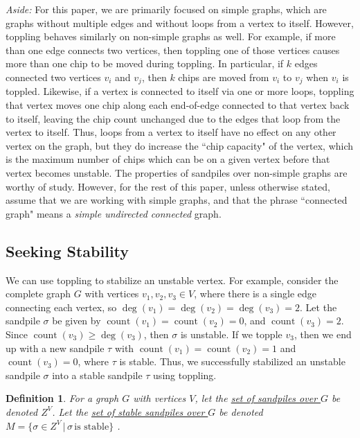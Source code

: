 \documentclass[12pt]{article}
\DeclareMathOperator{\ct}{count}
\DeclareMathOperator{\dg}{deg}
\newtheorem{definition}{Definition}
\begin{document}
\textit{Aside:}  For this paper, we are primarily focused on simple graphs, which are graphs without multiple edges and without loops from a vertex to itself.  However, toppling behaves similarly on non-simple graphs as well.  For example, if more than one edge connects two vertices, then toppling one of those vertices causes more than one chip to be moved during toppling.  In particular, if $k$ edges connected two vertices $v_i$ and $v_j$, then $k$ chips are moved from $v_i$ to $v_j$ when $v_i$ is toppled.  Likewise, if a vertex is connected to itself via one or more loops, toppling that vertex moves one chip along each end-of-edge connected to that vertex back to itself, leaving the chip count unchanged due to the edges that loop from the vertex to itself.  Thus, loops from a vertex to itself have no effect on any other vertex on the graph, but they do increase the ``chip capacity" of the vertex, which is the maximum number of chips which can be on a given vertex before that vertex becomes unstable.  The properties of sandpiles over non-simple graphs are worthy of study.  However, for the rest of this paper, unless otherwise stated, assume that we are working with simple graphs, and that the phrase ``connected graph" means a \textit{simple undirected connected} graph.

\subsection{Seeking Stability}

We can use toppling to stabilize an unstable vertex.  For example, consider the complete graph $G$ with vertices $v_1,v_2,v_3 \in V$, where there is a single edge connecting each vertex, so $\dg(v_1) = \dg(v_2) = \dg(v_3) = 2$.  Let the sandpile $\sigma$ be given by $\ct(v_1) = \ct(v_2) = 0$, and $\ct(v_3) = 2$.  Since $\ct(v_3) \geq \dg(v_3)$, then $\sigma$ is unstable.  If we topple $v_3$, then we end up with a new sandpile $\tau$ with $\ct(v_1) = \ct(v_2) = 1$ and $\ct(v_3) = 0$, where $\tau$ is stable.  Thus, we successfully stabilized an unstable sandpile $\sigma$ into a stable sandpile $\tau$ using toppling.

\begin{definition}
    For a graph $G$ with vertices $V$, let the \underline{set of sandpiles over $G$} be denoted $Z^V$.  Let the \underline{set of stable sandpiles over $G$} be denoted $M = \{\sigma \in Z^V \, | \, \sigma \, \text{is stable}\}$ \cite{levine}.
\end{definition}
\end{document}
